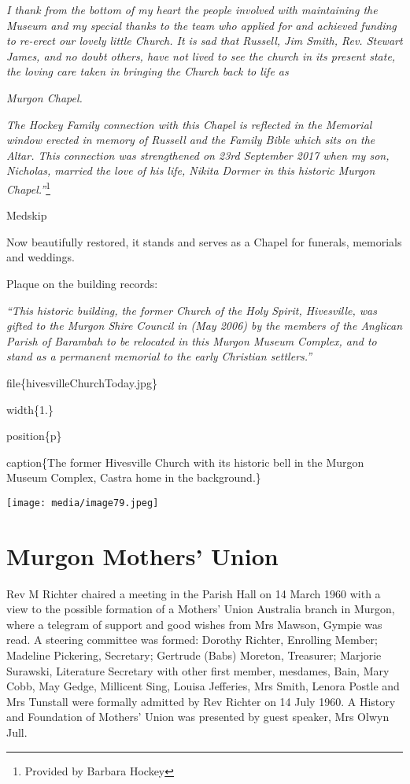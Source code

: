\emph{I thank from the bottom of my heart the people involved with maintaining the Museum and my special thanks to the team who applied for and achieved funding to re-erect our lovely little Church. It is sad that Russell, Jim Smith, Rev. Stewart James, and no doubt others, have not lived to see the church in its present state, the loving care taken in bringing the Church back to life as}

\emph{Murgon Chapel.}

\emph{The Hockey Family connection with this Chapel is reflected in the Memorial window erected in memory of Russell and the Family Bible which sits on the Altar. This connection was strengthened on 23rd September 2017 when my son, Nicholas, married the love of his life, Nikita Dormer in this historic Murgon Chapel.''}\footnote{Provided by Barbara Hockey}

Medskip

Now beautifully restored, it stands and serves as a Chapel for funerals, memorials and weddings.

Plaque on the building records:

\emph{``This historic building, the former Church of the Holy Spirit, Hivesville, was gifted to the Murgon Shire Council in (May 2006) by the members of the Anglican Parish of Barambah to be relocated in this Murgon Museum Complex, and to stand as a permanent memorial to the early Christian settlers.''}

file\{hivesvilleChurchToday.jpg\}

width\{1.\}

position\{p\}

caption\{The former Hivesville Church with its historic bell in the Murgon Museum Complex, Castra home in the background.\}

\texttt{[image: media/image79.jpeg]}

\hypertarget{murgon-mothers-union}{%
\section{Murgon Mothers' Union}\label{murgon-mothers-union}}

Rev M Richter chaired a meeting in the Parish Hall on 14 March 1960 with a view to the possible formation of a Mothers' Union Australia branch in Murgon, where a telegram of support and good wishes from Mrs Mawson, Gympie was read. A steering committee was formed: Dorothy Richter, Enrolling Member; Madeline Pickering, Secretary; Gertrude (Babs) Moreton, Treasurer; Marjorie Surawski, Literature Secretary with other first member, mesdames, Bain, Mary Cobb, May Gedge, Millicent Sing, Louisa Jefferies, Mrs Smith, Lenora Postle and Mrs Tunstall were formally admitted by Rev Richter on 14 July 1960. A History and Foundation of Mothers' Union was presented by guest speaker, Mrs Olwyn Jull.

